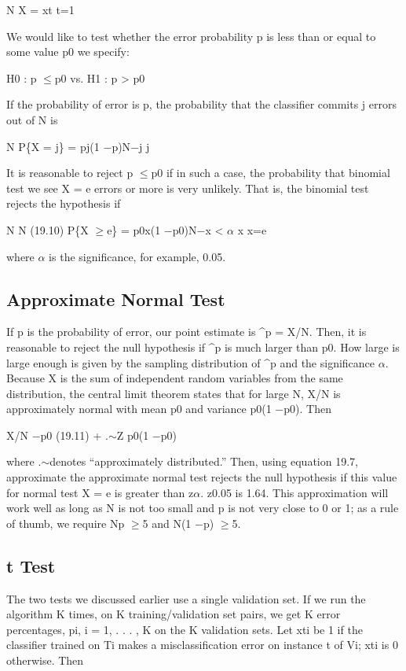 N X = xt t=1

We would like to test whether the error probability p is less than or equal to some value p0 we specify:

H0 : p $\leq$p0 vs. H1 : p > p0

If the probability of error is p, the probability that the classifier commits j errors out of N is

N P\{X = j\} = pj(1 $-$p)N$-$j j

It is reasonable to reject p $\leq$p0 if in such a case, the probability that binomial test we see X = e errors or more is very unlikely. That is, the binomial test rejects the hypothesis if

N N (19.10) P\{X $\geq$e\} = p0x(1 $-$p0)N$-$x < $\alpha$ x x=e

where $\alpha$ is the significance, for example, 0.05.

\subsection{Approximate Normal Test}

If p is the probability of error, our point estimate is \textasciicircum{}p = X/N. Then, it is reasonable to reject the null hypothesis if \textasciicircum{}p is much larger than p0. How large is large enough is given by the sampling distribution of \textasciicircum{}p and the significance $\alpha$. Because X is the sum of independent random variables from the same distribution, the central limit theorem states that for large N, X/N is approximately normal with mean p0 and variance p0(1 $-$p0). Then

X/N $-$p0 (19.11) + .$\sim$Z p0(1 $-$p0)

where .$\sim$denotes “approximately distributed.” Then, using equation 19.7, approximate the approximate normal test rejects the null hypothesis if this value for normal test X = e is greater than z$\alpha$. z0.05 is 1.64. This approximation will work well as long as N is not too small and p is not very close to 0 or 1; as a rule of thumb, we require Np $\geq$5 and N(1 $-$p) $\geq$5.

\subsection{t Test}

The two tests we discussed earlier use a single validation set. If we run the algorithm K times, on K training/validation set pairs, we get K error percentages, pi, i = 1, . . . , K on the K validation sets. Let xti be 1 if the classifier trained on Ti makes a misclassification error on instance t of Vi; xti is 0 otherwise. Then

